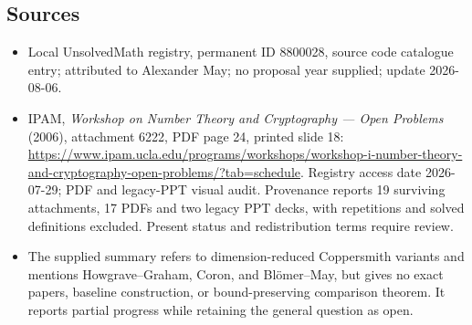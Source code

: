 \documentclass[11pt]{article}
\begin{document}
\subsection{Sources}
\begin{itemize}
\item Local UnsolvedMath registry, permanent ID 8800028, source code catalogue entry; attributed to Alexander May; no proposal year supplied; update 2026-08-06.
\item IPAM, \emph{Workshop on Number Theory and Cryptography --- Open Problems} (2006), attachment 6222, PDF page 24, printed slide 18: \url{https://www.ipam.ucla.edu/programs/workshops/workshop-i-number-theory-and-cryptography-open-problems/?tab=schedule}. Registry access date 2026-07-29; PDF and legacy-PPT visual audit. Provenance reports 19 surviving attachments, 17 PDFs and two legacy PPT decks, with repetitions and solved definitions excluded. Present status and redistribution terms require review.
\item The supplied summary refers to dimension-reduced Coppersmith variants and mentions Howgrave--Graham, Coron, and Bl\"omer--May, but gives no exact papers, baseline construction, or bound-preserving comparison theorem. It reports partial progress while retaining the general question as open.
\end{itemize}
\end{document}
